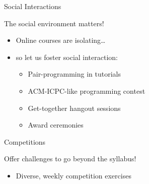 \documentclass{beamer}
\begin{document}
\begin{frame}{Social Interactions}
\centerline{\Large{\alert{The social environment matters!}}}
\pause
\begin{itemize}[<+->]
\item Online courses are isolating\dots
\item[] so let us foster social interaction:
\begin{itemize}[<4->]
  \item Pair-programming in tutorials
  \item ACM-ICPC-like programming contest
  \item Get-together hangout sessions
  \item Award ceremonies
\end{itemize}
\end{itemize}
\end{frame}

\begin{frame}[fragile]{Competitions}
\centerline{\Large{\alert{Offer challenges to go beyond the syllabus!}}}
\pause
\begin{itemize}[<+->]
\item Diverse, weekly competition exercises
\end{itemize}
\end{frame}
\end{document}
